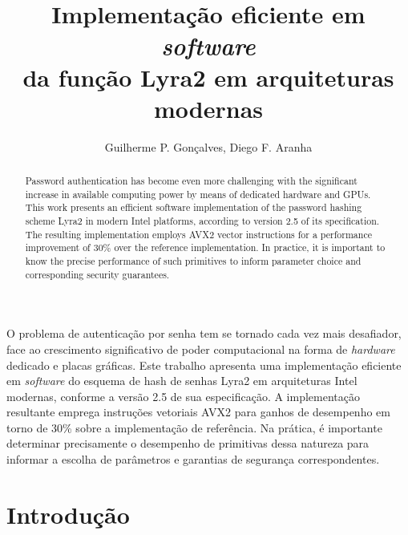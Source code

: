 \documentclass{article}
\begin{document}
\title{Implementação eficiente em \emph{software}\\ da função Lyra2 em arquiteturas modernas}

\author{Guilherme P. Gonçalves, Diego F. Aranha}

\address{Laboratório de Segurança e Criptografia (LASCA)\\
	Instituto de Computação (IC) -- Universidade Estadual de Campinas (Unicamp)\\
	Av. Albert Einsten, 1251 -- Campinas -- SP -- Brasil
}

\maketitle

\begin{abstract}
Password authentication has become even more challenging with the significant increase
in available computing power by means of dedicated hardware and GPUs. This work
presents an efficient software implementation of the password hashing scheme Lyra2 in modern Intel platforms,
according to version 2.5 of its specification. The resulting implementation employs
AVX2 vector instructions for a performance improvement of 30\% over the reference
implementation. In practice, it is important to know the precise performance of such primitives to inform
parameter choice and corresponding security guarantees.
\end{abstract}

\begin{resumo}
O problema de autenticação por senha tem se tornado cada vez mais desafiador, face ao crescimento
significativo de poder computacional na forma de \emph{hardware} dedicado e placas gráficas.
Este trabalho apresenta uma implementação eficiente em \emph{software} do esquema de hash de senhas Lyra2 em arquiteturas Intel modernas,
conforme a versão 2.5 de sua especificação. A implementação resultante emprega instruções vetoriais AVX2
para ganhos de desempenho em torno de 30\% sobre a implementação de referência. Na prática, é importante
determinar precisamente o desempenho de primitivas dessa natureza para informar a escolha de parâmetros
e garantias de segurança correspondentes.
\end{resumo}

\section{Introdução}
\end{document}

